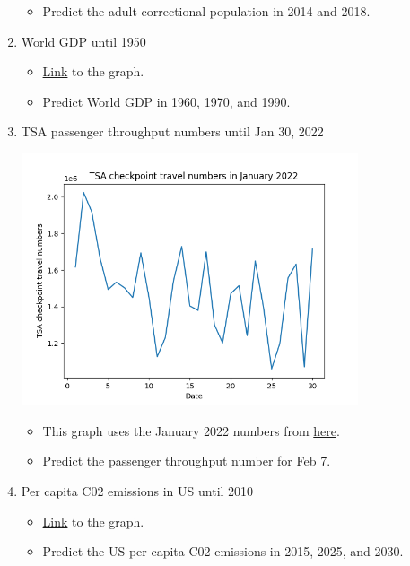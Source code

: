 \documentclass[11pt]{article}
\begin{document}
\begin{enumerate}
	\begin{itemize}
		\item Predict the adult correctional population in 2014 and 2018.
	\end{itemize}
	
	\item World GDP until 1950
	\begin{itemize}
		\item \href{https://ourworldindata.org/grapher/world-gdp-over-the-last-two-millennia?time=1..1950}{Link} to the graph.
		\item Predict World GDP in 1960, 1970, and 1990.
	\end{itemize}
	
	\item TSA passenger throughput numbers until Jan 30, 2022

	\begin{center}	
		\includegraphics[width = 375px]{tsa_checkpoint.png}
	\end{center}

	\begin{itemize}
		\item This graph uses the January 2022 numbers from \href{https://www.tsa.gov/coronavirus/passenger-throughput}{here}.
		\item Predict the passenger throughput number for Feb 7.
	\end{itemize}
	
	\item Per capita C02 emissions in US until 2010
	\begin{itemize}
		\item \href{https://ourworldindata.org/grapher/co-emissions-per-capita?tab=chart&time=1750..2010&country=~USA}{Link} to the graph.
		\item Predict the US per capita C02 emissions in 2015, 2025, and 2030.
	\end{itemize}
	

\end{enumerate}
\end{document}
